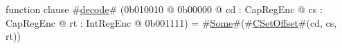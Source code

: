 function clause #\hyperref[sailMIPSzdecode]{decode}# (0b010010 @ 0b00000 @ cd : CapRegEnc @ cs : CapRegEnc @ rt : IntRegEnc @ 0b001111) = #\hyperref[sailMIPSzSome]{Some}#(#\hyperref[sailMIPSzCSetOffset]{CSetOffset}#(cd, cs, rt))
